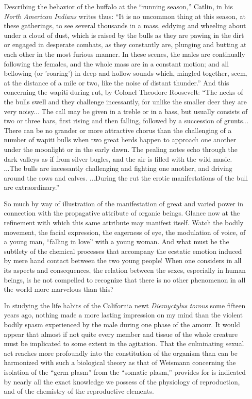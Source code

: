 \documentclass[a4paper, 11pt, oneside, polutonikogreek, english]{article}
\begin{document}
Describing the behavior of the buffalo at the ``running season,'' Catlin, in his \emph{North American Indians} writes thus: ``It is no uncommon thing at this season, at these gatherings, to see several thousands in a mass, eddying and wheeling about under a cloud of dust, which is raised by the bulls as they are pawing in the dirt or engaged in desperate combats, as they constantly are, plunging and butting at each other in the most furious manner. In these scenes, the males are continually following the females, and the whole mass are in a constant motion; and all bellowing (or 'roaring') in deep and hollow sounds which, mingled together, seem, at the distance of a mile or two, like the noise of distant thunder.'' And this concerning the wapiti during rut, by Colonel Theodore Roosevelt: ``The necks of the bulls swell and they challenge incessantly, for unlike the smaller deer they are very noisy... The call may be given in a treble or in a bass, but usually consists of two or three bars, first rising and then falling, followed by a succession of grunts... There can be no grander or more attractive chorus than the challenging of a number of wapiti bulls when two great herds happen to approach one another under the moonlight or in the early dawn. The pealing notes echo through the dark valleys as if from silver bugles, and the air is filled with the wild music. ...The bulls are incessantly challenging and fighting one another, and driving around the cows and calves. ...During the rut the erotic manifestations of the bull are extraordinary.''

So much by way of illustration of the manifestation of great and varied power in connection with the propagative attribute of organic beings. Glance now at the refinement with which this same attribute may manifest itself. Watch the bodily movement, the facial expression, the eagerness of eye, the modulation of voice, of a young man, ``falling in love'' with a young woman. And what must be the subtlety of the chemical processes that accompany the ecstatic emotion induced by mere hand contact between the two young people! When one considers in all its aspects and consequences, the relation between the sexes, especially in human beings, is he not compelled to recognize that there is no other phenomenon in all the world more marvelous than this?

In studying the life habits of the California newt \emph{Diemyctylus torous} some fifteen years ago, nothing made a more lasting impression on my mind than the violent bodily spasm experienced by the male during one phase of the amour. It would appear that almost if not quite every member and tissue of the whole creature must be implicated to some extent in the agitation. That the culminating sexual act reaches more profoundly into the constitution of the organism than can be harmonized with such a biological theory as that of Weismann concerning the isolation of the ``germ plasm'' from the ``somatic plasm,'' provides for is indicated by nearly all the exact knowledge we possess of the physiology of reproduction, and of the chemistry of the reproductive elements.
\end{document}
